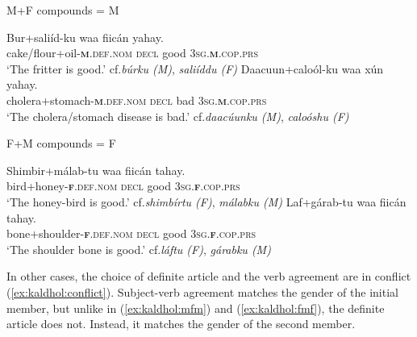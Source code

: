 \documentclass[output=paper]{langscibook}
\begin{document}
\ea\label{ex:kaldhol:mfm}
	M+F compounds = M
	\begin{xlist}
		\ex
		\gll Bur+saliíd-ku waa fiicán yahay.\\
		cake/flour+oil-\textsc{\textbf{m}.def.nom} \textsc{decl} good \textsc{3sg.\textbf{m}}.\textsc{cop.prs}\\
		\glt `The fritter is good.'	\hfill cf.\@ \textit{búrku (M)}, \textit{saliíddu (F)}
		\ex
		\gll Daacuun+caloól-ku waa xún yahay.\\
		cholera+stomach-\textsc{\textbf{m}.def.nom} \textsc{decl} bad \textsc{3sg.\textbf{m}}.\textsc{cop.prs}\\
		\glt `The cholera/stomach disease is bad.' \hfill cf.\@ \textit{daacúunku (M)}, \textit{caloóshu (F)}
	\end{xlist}
\ex\label{ex:kaldhol:fmf}
	F+M compounds = F
	\begin{xlist}
		\ex
		\gll Shimbir+málab-tu waa fiicán tahay.\\
		bird+honey-\textsc{\textbf{f}.def.nom} \textsc{decl} good \textsc{3sg.\textbf{f}}.\textsc{cop.prs}\\
		\glt `The honey-bird is good.' \hfill cf.\@ \textit{shimbírtu (F)}, \textit{málabku (M)}
		\ex
		\gll Laf+gárab-tu waa fiicán tahay.\\
		bone+shoulder-\textsc{\textbf{f}.def.nom} \textsc{decl} good \textsc{3sg.\textbf{f}}.\textsc{cop.prs}\\
		\glt `The shoulder bone is good.' \hfill cf.\@ \textit{láftu (F)}, \textit{gárabku (M)}
	\end{xlist}
\z
In other cases, the choice of definite article and the verb agreement are in conflict (\ref{ex:kaldhol:conflict}). Subject-verb agreement matches the gender of the initial member, but unlike in (\ref{ex:kaldhol:mfm}) and (\ref{ex:kaldhol:fmf}), the definite article does not. Instead, it matches the gender of the second member.
\end{document}
